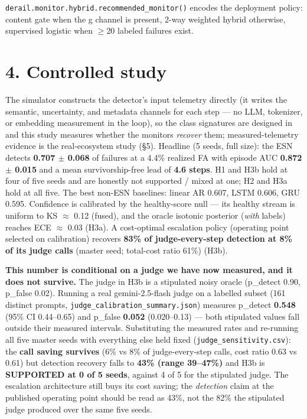\documentclass[11pt]{article}
\begin{document}
\texttt{derail.monitor.hybrid.recommended\_\allowbreak{}monitor()} encodes the deployment policy: content gate when the g channel is present, 2-way weighted hybrid otherwise, supervised logistic when $\geq$20 labeled failures exist.


\section{4. Controlled study}


The simulator constructs the detector's input telemetry directly (it writes the semantic, uncertainty, and metadata channels for each step --- no LLM, tokenizer, or embedding measurement in the loop), so the class signatures are designed in and this study measures whether the monitors \emph{recover} them; measured-telemetry evidence is the real-ecosystem study (\S{}5). Headline (5 seeds, full size): the ESN detects \textbf{0.707 $\pm$ 0.068} of failures at a 4.4\% realized FA with episode AUC \textbf{0.872 $\pm$ 0.015} and a mean survivorship-free lead of \textbf{4.6 steps}. H1 and H3b hold at four of five seeds and are honestly not supported / mixed at one; H2 and H3a hold at all five. The best non-ESN baselines: linear AR 0.607, LSTM 0.606, GRU 0.595. Confidence is calibrated by the healthy-score null --- its healthy stream is uniform to KS $\approx$ 0.12 (fused), and the oracle isotonic posterior (\emph{with} labels) reaches ECE $\approx$ 0.03 (H3a). A cost-optimal escalation policy (operating point selected on calibration) recovers \textbf{83\% of judge-every-step detection at 8\% of its judge calls} (master seed; total-cost ratio 61\%) (H3b).


\textbf{This number is conditional on a judge we have now measured, and it does not survive.} The judge in H3b is a stipulated noisy oracle (p\_detect 0.90, p\_false 0.02). Running a real gemini-2.5-flash judge on a labelled subset (161 distinct prompts, \texttt{judge\_\allowbreak{}calibration\_\allowbreak{}summary.json}) measures p\_detect \textbf{0.548} (95\% CI 0.44--0.65) and p\_false \textbf{0.052} (0.020--0.13) --- both stipulated values fall outside their measured intervals. Substituting the measured rates and re-running all five master seeds with everything else held fixed (\texttt{judge\_\allowbreak{}sensitivity.csv}): the \textbf{call saving survives} (6\% vs 8\% of judge-every-step calls, cost ratio 0.63 vs 0.61) but detection recovery falls to \textbf{43\% (range 39--47\%)} and H3b is \textbf{SUPPORTED at 0 of 5 seeds}, against 4 of 5 for the stipulated judge. The escalation architecture still buys its cost saving; the \emph{detection} claim at the published operating point should be read as 43\%, not the 82\% the stipulated judge produced over the same five seeds.
\end{document}
